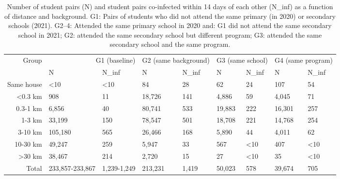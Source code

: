 \begin{table}[ht!]
\caption{Number of student pairs (N) and student pairs co-infected within 14 days of each other (N\_inf) as a function of distance and background. G1: Pairs of students who did not attend the same primary (in 2020) or secondary schools (2021). G2--4: Attended the same primary school in 2020 and: G1 did not attend the same secondary school in 2021; G2: attended the same secondary school but different program; G3: attended the same secondary school and the same program.}
\label{t:summary_pairs}
\begin{tabular}{r|llllllll}
\toprule
Group & \multicolumn{2}{r}{G1 (baseline)} & \multicolumn{2}{r}{G2 (same background)} & \multicolumn{2}{r}{G3 (same school)} & \multicolumn{2}{r}{G4 (same program)} \\
 & N & N_inf & N & N_inf & N & N_inf & N & N_inf \\
\midrule
Same house & <10 & <10 & 84 & 28 & 62 & 24 & 107 & 54 \\
<0.3 km & 908 & 11 & 18,726 & 141 & 4,886 & 59 & 4,045 & 71 \\
0.3-1 km & 6,856 & 40 & 80,741 & 533 & 19,883 & 222 & 16,301 & 257 \\
1-3 km & 33,199 & 150 & 78,547 & 501 & 18,708 & 221 & 14,768 & 254 \\
3-10 km & 105,180 & 565 & 26,466 & 168 & 5,890 & 44 & 4,011 & 62 \\
10-30 km & 49,247 & 259 & 5,947 & 33 & 567 & <10 & 407 & <10 \\
>30 km & 38,467 & 214 & 2,720 & 15 & 27 & <10 & 35 & <10 \\
Total & 233,857-233,867 & 1,239-1,249 & 213,231 & 1,419 & 50,023 & 578 & 39,674 & 705 \\
\bottomrule
\end{tabular}
\end{table}
